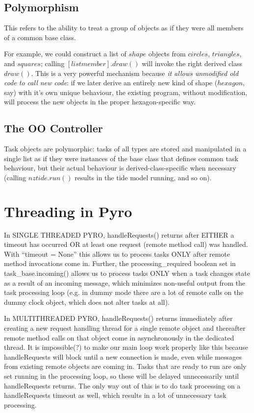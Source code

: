 \documentclass[11pt,a4paper]{report}
\begin{document}
\section{Polymorphism}

This refers to the ability to treat a group of objects as if they were
all members of a common base class.

For example, we could construct a list of $shape$ objects from
$circles$, $triangles$, and $squares$; calling $[list member].draw()$
will invoke the right derived class $draw()$. This is a very powerful
mechanism because {\em it allows unmodified old code to call new code}:
if we later derive an entirely new kind of shape ($hexagon$, say) with
it's own unique behaviour, the existing program, without modification,
will process the new objects in the proper hexagon-specific way.

\section{The OO Controller}

Task objects are polymorphic: tasks of all types are stored and
manipulated in a single list as if they were instances of the base class
that defines common task behaviour, but their actual behaviour is
derived-class-specific when necessary (calling $nztide.run()$ results in
the tide model running, and so on). 


\chapter{Threading in Pyro} \label{pyro-appendix}

In SINGLE THREADED PYRO, handleRequests() returns after EITHER a timeout has
occurred OR at least one request (remote method call) was handled.  With
``timeout = None'' this allows us to process tasks ONLY after remote method
invocations come in. Further, the processing\_required boolean set in
task\_base.incoming() allows us to process tasks ONLY when a task changes state
as a result of an incoming message, which minimizes non-useful output from the
task processing loop (e.g. in dummy mode there are a lot of remote calls on
the dummy clock object, which does not alter tasks at all). 

In MULTITHREADED PYRO, handleRequests() returns immediately after creating a
new request handling thread for a single remote object and thereafter remote
method calls on that object come in asynchronously in the dedicated thread.
It is impossible(?) to make our main loop work properly like this because
handleRequests will block until a new connection is made, even while messages
from existing remote objects are coming in.  Tasks that are ready to run are
only set running in the processing loop, so these will be delayed
unnecessarily until handleRequests returns.  The only way out of this is to do
task processing on a handleRequests timeout as well, which results in a lot of
unnecessary task processing.
 
\end{document}

